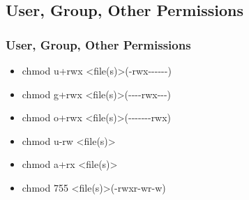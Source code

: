\documentclass[hyperref={pdfpagelabels=false}]{beamer}
\begin{document}
\subsection{User, Group, Other Permissions}
\frame
{
    \frametitle{User, Group, Other Permissions}
    \begin{itemize}
    \item{chmod u+rwx {\textless}file(s)\textgreater\hspace{.5 pc}(-\hspace{.1 pc}r\hspace{.1 pc}w\hspace{.1 pc}x\hspace{.1 pc}-\hspace{.1 pc}-\hspace{.1 pc}-\hspace{.1 pc}-\hspace{.1 pc}-\hspace{.1 pc}-)}
    \item{chmod g+rwx {\textless}file(s)\textgreater\hspace{.5 pc}(-\hspace{.1 pc}-\hspace{.1 pc}-\hspace{.1 pc}-\hspace{.1 pc}r\hspace{.1 pc}w\hspace{.1 pc}x\hspace{.1 pc}-\hspace{.1 pc}-\hspace{.1 pc}-)}
    \item{chmod o+rwx {\textless}file(s)\textgreater\hspace{.5 pc}(-\hspace{.1 pc}-\hspace{.1 pc}-\hspace{.1 pc}-\hspace{.1 pc}-\hspace{.1 pc}-\hspace{.1 pc}-\hspace{.1 pc}r\hspace{.1 pc}w\hspace{.1 pc}x)}
    \end{itemize}
    \begin{itemize}
    \item{chmod u-rw {\textless}file(s)\textgreater\hspace{.5 pc}}
    \item{chmod a+rx {\textless}file(s)\textgreater\hspace{.5 pc}}
    \item{chmod 755 {\textless}file(s)\textgreater\hspace{.5 pc}(-\hspace{.1 pc}r\hspace{.1 pc}w\hspace{.1 pc}x\hspace{.1 pc}r\hspace{.1 pc}-\hspace{.1 pc}wr\hspace{.1 pc}-\hspace{.1 pc}w)}
    \end{itemize}
}
\end{document}
